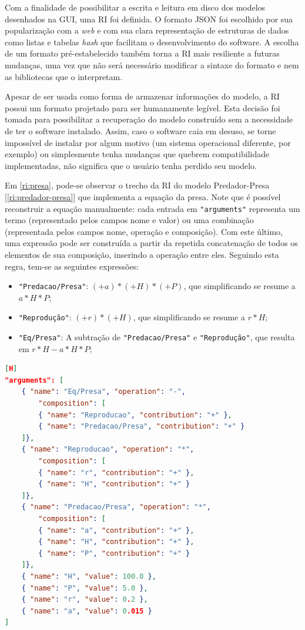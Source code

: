 \documentclass[
	12pt,				%
	openright,			%
	oneside,			%
	a4paper,			%
	main=brazil,
	english,			%
	]{ufsj-abntex2}
\begin{document}
Com a finalidade de possibilitar a escrita e leitura em disco dos modelos desenhados na GUI, uma RI foi definida. O formato JSON foi escolhido por sua popularização com a \textit{web} e com sua clara representação de estruturas de dados como listas e tabelas \textit{hash} que facilitam o desenvolvimento do software. A escolha de um formato pré-estabelecido também torna a RI mais resiliente a futuras mudanças, uma vez que não será necessário modificar a sintaxe do formato e nem as bibliotecas que o interpretam.

Apesar de ser usada como forma de armazenar informações do modelo, a RI possui um formato projetado para ser humanamente legível. Esta decisão foi tomada para possibilitar a recuperação do modelo construído sem a necessidade de ter o software instalado. Assim, caso o software caia em desuso, se torne impossível de instalar por algum motivo (um sistema operacional diferente, por exemplo) ou simplesmente tenha mudanças que quebrem compatibilidade implementadas, não significa que o usuário tenha perdido seu 
modelo.

Em \ref{ri:presa}, pode-se observar o trecho da RI do modelo Predador-Presa [\ref{ri:predador-presa}] que implementa a equação da presa. Note que é possível reconstruir a equação manualmente: cada entrada em \texttt{"arguments"} representa um termo (representado pelos campos nome e valor) ou uma combinação (representada pelos campos nome, operação e composição). Com este último, uma expressão pode ser construída a partir da repetida concatenação de todos os elementos de sua composição, inserindo a operação entre eles. Seguindo esta regra, tem-se as seguintes expressões:

\begin{itemize}
    \item \texttt{"Predacao/Presa"}: \((+a)*(+H)*(+P)\), que simplificando se resume a \(a*H*P\);
    \item \texttt{"Reprodução"}: \((+r)*(+H)\), que simplificando se resume a \(r*H\);
    \item \texttt{"Eq/Presa"}: A subtração de \texttt{"Predacao/Presa"} e \texttt{"Reprodução"}, que resulta em \(r*H-a*H*P\);
\end{itemize}

\begin{lstlisting}[language=json, label=ri:presa, caption=Trecho da RI que define termos e combinações usadas para definir a equação da presa.][H]
"arguments": [
    { "name": "Eq/Presa", "operation": "-",
        "composition": [
        { "name": "Reproducao", "contribution": "+" },
        { "name": "Predacao/Presa", "contribution": "+" }
    ]},
    { "name": "Reproducao", "operation": "*",
        "composition": [
        { "name": "r", "contribution": "+" },
        { "name": "H", "contribution": "+" }
    ]},
    { "name": "Predacao/Presa", "operation": "*",
        "composition": [
        { "name": "a", "contribution": "+" },
        { "name": "H", "contribution": "+" },
        { "name": "P", "contribution": "+" }
    ]},
    { "name": "H", "value": 100.0 },
    { "name": "P", "value": 5.0 },
    { "name": "r", "value": 0.2 },
    { "name": "a", "value": 0.015 }
]
\end{lstlisting}
\end{document}
